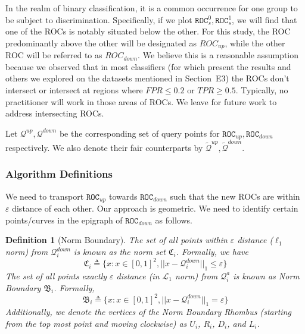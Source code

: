 \documentclass{article}
\newtheorem{definition}{Definition}[section]
\newcommand{\ouralgo}{\texttt{FROC}}
\newcommand{\ourdef}{-Equalized ROC}
\newcommand{\roc}{\texttt{ROC}_s}
\begin{document}
In the realm of binary classification, it is a common occurrence for one group to be subject to discrimination. Specifically, if we plot $\roc^0,\roc^1$, we will find that one of the ROCs is notably situated below the other.
For this study, the ROC predominantly above the other will be designated as $ROC_{up}$, while the other ROC will be referred to as $ROC_{down}$. We believe this is a reasonable assumption because we observed that in most classifiers (for which present the results and others we explored on the datasets mentioned in Section~E3) the ROCs don't intersect or intersect at regions where $FPR \le 0.2$ or $TPR \ge 0.5$. Typically, no practitioner will work in those areas of ROCs. We leave for future work to address intersecting ROCs.

Let $\mathcal{Q}^{up}, \mathcal{Q}^{down}$ be the corresponding set of query points for $\texttt{ROC}_{up}, \texttt{ROC}_{down}$ respectively. We also denote their fair counterparts by $\widetilde{\mathcal{Q}}^{up}, \widetilde{\mathcal{Q}}^{down}$.

\subsubsection{Algorithm Definitions}
We need to transport $\texttt{ROC}_{up}$ towards $\texttt{ROC}_{down}$ such that the new ROCs are within $\varepsilon$ distance of each other. Our approach is geometric. We need to identify certain points/curves in the epigraph of $\texttt{ROC}_{down}$ as follows.
\begin{definition}[Norm Boundary] \label{def:eNBoundary}
The set of all points within $\varepsilon$ distance ($\ell_1$ norm) from $\mathcal{Q}_i^{down}$ is known as the \emph{norm set} $\mathfrak{C}_i$. Formally, we have \[\mathfrak{C}_i \triangleq \{ x: x\in [0,1]^2 , ||x - \mathcal{Q}_i^{down}||_1 \le \varepsilon\}\]
The set of all points exactly $\varepsilon$ distance (in $\mathcal{L}_1$ norm) from $\mathcal{Q}_i^a$ is known as \emph{Norm Boundary} $\mathfrak{B}_i$. Formally, 
\[\mathfrak{B}_i \triangleq \{ x: x\in [0,1]^2 , ||x - \mathcal{Q}_i^{down}||_1 = \varepsilon\}\]
Additionally, we denote the vertices of the Norm Boundary Rhombus (starting from the top most point and moving clockwise) as $U_i$, $R_i$, $D_i$, and $L_i$.
\end{definition}
\end{document}
